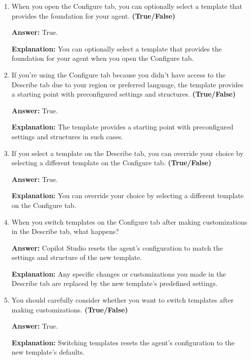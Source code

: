 \documentclass[10pt]{article}
\begin{document}
\begin{enumerate}[leftmargin=*]
\textbf{Answer:} True.

\textbf{Explanation:} The Configure tab enables you to view and edit detailed information about the agent, giving you more control and precision over its performance.

\item When you open the Configure tab, you can optionally select a template that provides the foundation for your agent. \textbf{(True/False)}

\textbf{Answer:} True.

\textbf{Explanation:} You can optionally select a template that provides the foundation for your agent when you open the Configure tab.

\item If you’re using the Configure tab because you didn’t have access to the Describe tab due to your region or preferred language, the template provides a starting point with preconfigured settings and structures. \textbf{(True/False)}

\textbf{Answer:} True.

\textbf{Explanation:} The template provides a starting point with preconfigured settings and structures in such cases.

\item If you select a template on the Describe tab, you can override your choice by selecting a different template on the Configure tab. \textbf{(True/False)}

\textbf{Answer:} True.

\textbf{Explanation:} You can override your choice by selecting a different template on the Configure tab.

\item When you switch templates on the Configure tab after making customizations in the Describe tab, what happens?

\textbf{Answer:} Copilot Studio resets the agent's configuration to match the settings and structure of the new template.

\textbf{Explanation:} Any specific changes or customizations you made in the Describe tab are replaced by the new template’s predefined settings.

\item You should carefully consider whether you want to switch templates after making customizations. \textbf{(True/False)}

\textbf{Answer:} True.

\textbf{Explanation:} Switching templates resets the agent's configuration to the new template's defaults.


\end{enumerate}
\end{document}
